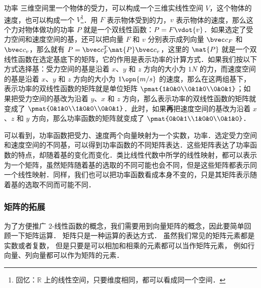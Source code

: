 \begin{example}{功率}
三维空间里一个物体的受力，可以构成一个三维实线性空间 $V$，这个物体的速度，也可以构成一个 $V$\footnote{回忆：$\mathbb{R}$ 上的线性空间，只要维度相同，都可以看成同一个空间．}．用 ${F}$ 表示物体受到的力，${v}$ 表示物体的速度，那么这个力对物体做功的功率 $P$ 就是一个双线性函数：$P={F}\vdot{v}$．如果选定了受力空间和速度空间的基，还可以把向量 ${F}$ 和 ${v}$ 分别表示成列向量 $\bvec c_F$ 和 $\bvec c_v$，那么就有 $P=\bvec c^T_F\mat {P}\bvec c_v$，这里的 $\mat{P}$ 就是一个双线性函数在选定基底下的矩阵，它的作用是表示功率的计算方式．如果我们按以下方式选择基：受力空间的基是沿着 $x$、$y$ 和 $z$ 方向的大小为 $1N$ 的力，而速度空间的基是沿着 $x$、$y$ 和 $z$ 方向的大小为 $1\opn{m/s}$ 的速度，那么在这两组基下，表示功率的双线性函数的矩阵就是单位矩阵 $\pmat{1&0&0\\0&1&0\\0&0&1}$；如果把受力空间的基改为沿着 $y$、$x$ 和 $z$ 方向，那么表示功率的双线性函数的矩阵就变成了 $\pmat{0&1&0\\1&0&0\\0&0&1}$．此时，如果\textbf{再}把速度空间的基改为沿着 $x$、$z$ 和 $y$ 方向，那么功率函数的矩阵就变成了 $\pmat{0&0&1\\1&0&0\\0&1&0}$．
\end{example}

可以看到，功率函数把受力、速度两个向量映射为一个实数，功率．选定受力空间和速度空间的不同基，可以得到功率函数的不同矩阵表达．这些矩阵表达了功率函数的特点，却随着基的变化而变化．类比线性代数中所学的线性映射，都可以表示为一个矩阵，虽然矩阵随着基的选取的不同可能也会不同，但是这些矩阵都表示同一个线性映射．同样，我们也可以把功率函数看成本身不变的，只是其矩阵表示随着基的选取不同而可能不同．

\subsubsection{矩阵的拓展}

为了方便推广 $2$-线性函数的概念，我们需要用到向量矩阵的概念，因此要简单回顾一下矩阵运算． 矩阵只是一种运算的表达方式． 虽然我们常见的矩阵元素都是实数或者复数， 但是只要是可以相加和相乘的元素都可以当作矩阵元素， 例如行向量、列向量都可以作为矩阵的元素．

